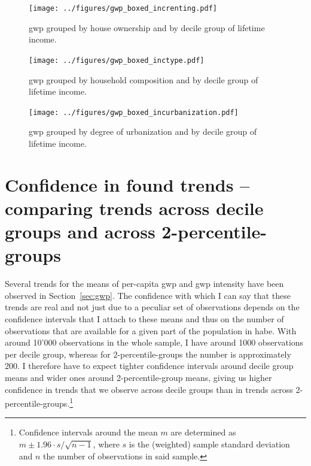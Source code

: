 \documentclass[a4paper,11pt,abstract=true]{scrartcl}
\begin{document}

\begin{figure}
  \centering
  \texttt{[image: ../figures/gwp\_boxed\_increnting.pdf]}
  \caption[House ownership by decile]{\ac{gwp} grouped by house ownership and by decile group of lifetime income.}
  \label{fig:increnting}
\end{figure}

\begin{figure}
  \centering
  \texttt{[image: ../figures/gwp\_boxed\_inctype.pdf]}
  \caption[Household type by decile]{\ac{gwp} grouped by household composition and by decile group of lifetime income.}
  \label{fig:inctype}
\end{figure}

\begin{figure}
  \centering
  \texttt{[image: ../figures/gwp\_boxed\_incurbanization.pdf]}
  \caption[Urbanization by decile]{\ac{gwp} grouped by degree of urbanization and by decile group of lifetime income.}
  \label{fig:incurban}
\end{figure}

\clearpage

\section{Confidence in found trends -- comparing trends across decile groups and across 2-percentile-groups}
\label{app:cis}

Several trends for the means of per-capita \ac{gwp} and \ac{gwp} intensity have been observed in Section~\ref{sec:gwp}.
The confidence with which I can say that these trends are real and not just due to a peculiar set of observations depends on the confidence intervals that I attach to these means and thus on the number of observations that are available for a given part of the population in \ac{habe}.
With around 10'000 observations in the whole sample, I have around 1000 observations per decile group, whereas for 2-percentile-groups the number is approximately 200.
I therefore have to expect tighter confidence intervals around decile group means and wider ones around 2-percentile-group means, giving us higher confidence in trends that we observe across decile groups than in trends across 2-percentile-groups.\footnote{%
  Confidence intervals around the mean $m$ are determined as
  $m \pm 1.96 \cdot s/\sqrt{n-1}$, where $s$ is the (weighted) sample standard deviation and $n$ the number of observations in said sample.
}
\end{document}
